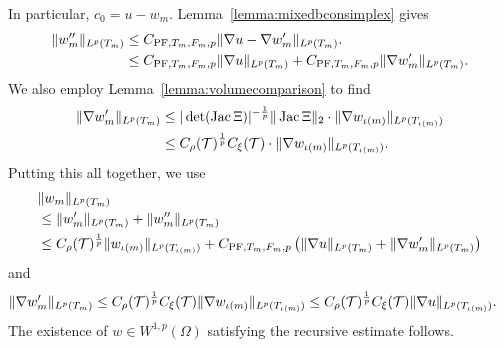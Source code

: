 \documentclass[a4paper]{article}
\begin{document}
    In particular, $c_{0} = u - w_{m}$. 
    Lemma~\ref{lemma:mixedbconsimplex} gives 
    \begin{align*}
        \| w''_{m} \|_{L^{p}(T_{m})} 
        &
        \leq 
        C_{{\rm PF},T_{m},F_{m},p} \| \nabla u - \nabla w'_{m} \|_{L^{p}(T_{m})}.
        \\&
        \leq 
        C_{{\rm PF},T_{m},F_{m},p} \| \nabla u      \|_{L^{p}(T_{m})} 
        + 
        C_{{\rm PF},T_{m},F_{m},p} \| \nabla w'_{m} \|_{L^{p}(T_{m})} 
        .
    \end{align*}
    We also employ Lemma~\ref{lemma:volumecomparison} to find 
    \begin{align*}
        \| \nabla w'_{m} \|_{L^{p}(T_{m})}
        &
        \leq 
        |\det(\operatorname{{\rm Jac}} \Xi  )|^{-\frac 1 p} 
        \|  \operatorname{{\rm Jac}} \Xi    \|_{2}
        \cdot 
        \| \nabla w_{\iota(m)} \|_{L^{p}(T_{\iota(m)})}
        \\&
        \leq 
        C_\rho({\mathcal T})^{\frac 1 p} C_\xi({\mathcal T})
        \cdot 
        \| \nabla w_{\iota(m)} \|_{L^{p}(T_{\iota(m)})}
        .
    \end{align*}
    Putting this all together, we use 
    \begin{align*}
        &
        \| w_{m} \|_{L^{p}(T_{m})}
        \\&
        \leq  
        \| w'_{m} \|_{L^{p}(T_{m})}
        + 
        \| w''_{m} \|_{L^{p}(T_{m})}
        \\&
        \leq  
        C_\rho({\mathcal T})^{\frac 1 p} 
        \| w_{\iota(m)} \|_{L^{p}(T_{\iota(m)})} 
        + 
        C_{{\rm PF},T_{m},F_{m},p} 
        \left( 
            \| \nabla u \|_{L^{p}(T_{m})} 
            + 
            \| \nabla w'_{m} \|_{L^{p}(T_{m})} 
        \right) 
    \end{align*}
    and 
    \begin{align*}
        \| \nabla w'_{m} \|_{L^{p}(T_{m})} 
        &
        \leq  
        C_\rho({\mathcal T})^{\frac 1 p} C_\xi({\mathcal T})
        \| \nabla w_{\iota(m)} \|_{L^{p}(T_{\iota(m)})} 
        \leq  
        C_\rho({\mathcal T})^{\frac 1 p} C_\xi({\mathcal T})
        \| \nabla u \|_{L^{p}(T_{\iota(m)})} 
        .
    \end{align*}
    The existence of $w \in W^{1,p}(\Omega)$ satisfying the recursive estimate follows. 
\end{document}
